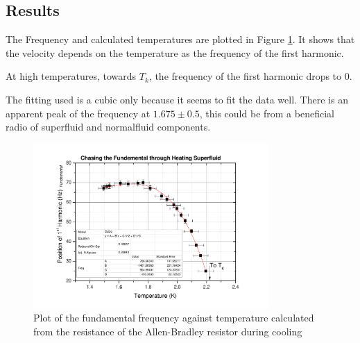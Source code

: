 \subsection{Results}

The Frequency and calculated temperatures are plotted in Figure \ref{fig:fundementalchasing}.
It shows that the velocity depends on the temperature as the frequency of the first harmonic.

At high temperatures, towards $T_k$, the frequency of the first harmonic drops to $0$.

The fitting used is a cubic only because it seems to fit the data well.
There is an apparent peak of the frequency at $1.675\pm 0.5$, this could be from
a beneficial radio of superfluid and normalfluid components.
\begin{figure}[htbp]
\centering
\includegraphics[width = 0.8\textwidth]{pics/fundementalchasing.pdf}
\caption{Plot of the fundamental frequency against temperature calculated from
the resistance of the Allen-Bradley resistor during cooling \label{fig:fundementalchasing}}
\end{figure}


